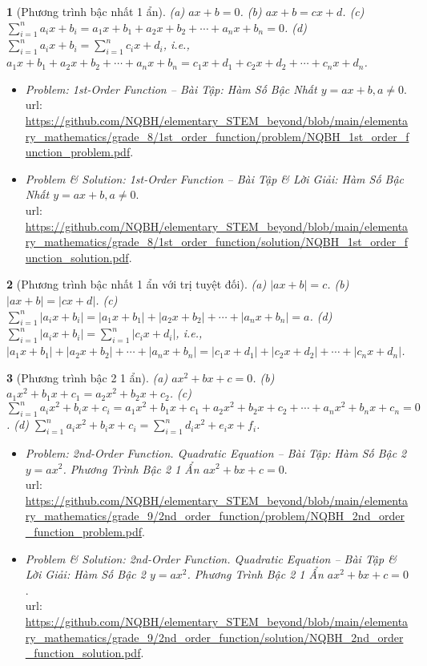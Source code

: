 \documentclass{article}
\newtheorem{baitoan}{}
\begin{document}
\begin{baitoan}[Phương trình bậc nhất 1 ẩn]
	(a) $ax + b = 0$. (b) $ax + b = cx + d$. (c) $\sum_{i=1}^n a_ix + b_i = a_1x + b_1 + a_2x + b_2 + \cdots + a_nx + b_n = 0$. (d) $\sum_{i=1}^n a_ix + b_i = \sum_{i=1}^n c_ix + d_i$, i.e., $a_1x + b_1 + a_2x + b_2 + \cdots + a_nx + b_n = c_1x + d_1 + c_2x + d_2 + \cdots + c_nx + d_n$.
\end{baitoan}

\begin{itemize}
	\item \textit{Problem: 1st-Order Function -- Bài Tập: Hàm Số Bậc Nhất $y = ax + b,a\ne0$}.\\{\sc url}: \url{https://github.com/NQBH/elementary_STEM_beyond/blob/main/elementary_mathematics/grade_8/1st_order_function/problem/NQBH_1st_order_function_problem.pdf}.
	\item \textit{Problem \& Solution: 1st-Order Function -- Bài Tập \& Lời Giải: Hàm Số Bậc Nhất $y = ax + b,a\ne0$}.\\{\sc url}: \url{https://github.com/NQBH/elementary_STEM_beyond/blob/main/elementary_mathematics/grade_8/1st_order_function/solution/NQBH_1st_order_function_solution.pdf}.
\end{itemize}

\begin{baitoan}[Phương trình bậc nhất 1 ẩn với trị tuyệt đối]
	(a) $|ax + b| = c$. (b) $|ax + b| = |cx + d|$. (c) $\sum_{i=1}^n |a_ix + b_i| = |a_1x + b_1| + |a_2x + b_2| + \cdots + |a_nx + b_n| = a$. (d) $\sum_{i=1}^n |a_ix + b_i| = \sum_{i=1}^n |c_ix + d_i|$, i.e., $|a_1x + b_1| + |a_2x + b_2| + \cdots + |a_nx + b_n| = |c_1x + d_1| + |c_2x + d_2| + \cdots + |c_nx + d_n|$.
\end{baitoan}

\begin{baitoan}[Phương trình bậc 2 1 ẩn]
	(a) $ax^2 + bx + c = 0$. (b) $a_1x^2 + b_1x + c_1 = a_2x^2 + b_2x + c_2$. (c) $\sum_{i=1}^n a_ix^2 + b_ix + c_i = a_1x^2 + b_1x + c_1 + a_2x^2 + b_2x + c_2 + \cdots + a_nx^2 + b_nx + c_n = 0$. (d) $\sum_{i=1}^n a_ix^2 + b_ix + c_i = \sum_{i=1}^n d_ix^2 + e_ix + f_i$.
\end{baitoan}

\begin{itemize}
	\item \textit{Problem: 2nd-Order Function. Quadratic Equation -- Bài Tập: Hàm Số Bậc 2 $y = ax^2$. Phương Trình Bậc 2 1 Ẩn $ax^2 + bx + c = 0$}.\\{\sc url}: \url{https://github.com/NQBH/elementary_STEM_beyond/blob/main/elementary_mathematics/grade_9/2nd_order_function/problem/NQBH_2nd_order_function_problem.pdf}.
	\item \textit{Problem \& Solution: 2nd-Order Function. Quadratic Equation -- Bài Tập \& Lời Giải: Hàm Số Bậc 2 $y = ax^2$. Phương Trình Bậc 2 1 Ẩn $ax^2 + bx + c = 0$}.\\{\sc url}: \url{https://github.com/NQBH/elementary_STEM_beyond/blob/main/elementary_mathematics/grade_9/2nd_order_function/solution/NQBH_2nd_order_function_solution.pdf}.
\end{itemize}
\end{document}
